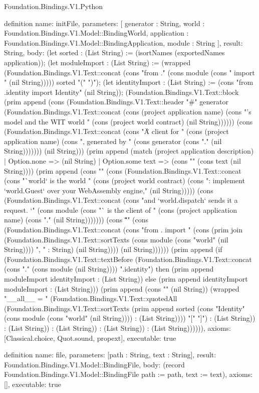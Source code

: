 \begin{lexlean}{Foundation.Bindings.V1.Python}
\begin{semanticmodule}
definition{
  name: initFile,
  parameters: [
    generator : String,
    world : Foundation.Bindings.V1.Model::BindingWorld,
    application : Foundation.Bindings.V1.Model::BindingApplication,
    module : String
  ],
  result: String,
  body: (let sorted : (List String) := (isortNames (exportedNames application)); (let moduleImport : (List String) := (wrapped (Foundation.Bindings.V1.Text::concat (cons "from ." (cons module (cons " import " (nil String))))) sorted "(" ")"); (let identityImport : (List String) := (cons "from .identity import Identity" (nil String)); (Foundation.Bindings.V1.Text::block (prim append (cons (Foundation.Bindings.V1.Text::header "#" generator (Foundation.Bindings.V1.Text::concat (cons (project application name) (cons "'s model and the WIT world " (cons (project world contract) (nil String)))))) (cons (Foundation.Bindings.V1.Text::concat (cons "\"\"\"A client for " (cons (project application name) (cons ", generated by " (cons generator (cons "." (nil String))))))) (nil String))) (prim append (match (project application description)
    | Option.none => (nil String)
    | Option.some text => (cons "" (cons text (nil String)))) (prim append (cons "" (cons (Foundation.Bindings.V1.Text::concat (cons "`world` is the world " (cons (project world contract) (cons ": implement `world.Guest` over your WebAssembly engine," (nil String))))) (cons (Foundation.Bindings.V1.Text::concat (cons "and `world.dispatch` sends it a request. `" (cons module (cons "` is the client of " (cons (project application name) (cons "." (nil String))))))) (cons "\"\"\"\n" (cons (Foundation.Bindings.V1.Text::concat (cons "from . import " (cons (prim join (Foundation.Bindings.V1.Text::sortTexts (cons module (cons "world" (nil String)))) ", " : String) (nil String)))) (nil String)))))) (prim append (if (Foundation.Bindings.V1.Text::textBefore (Foundation.Bindings.V1.Text::concat (cons "." (cons module (nil String)))) ".identity") then (prim append moduleImport identityImport : (List String)) else (prim append identityImport moduleImport : (List String))) (prim append (cons "" (nil String)) (wrapped "__all__ = " (Foundation.Bindings.V1.Text::quotedAll (Foundation.Bindings.V1.Text::sortTexts (prim append sorted (cons "Identity" (cons module (cons "world" (nil String)))) : (List String)))) "[" "]") : (List String)) : (List String)) : (List String)) : (List String)) : (List String)))))),
  axioms: [Classical.choice, Quot.sound, propext],
  executable: true
}

definition{
  name: file,
  parameters: [path : String, text : String],
  result: Foundation.Bindings.V1.Model::BindingFile,
  body: (record Foundation.Bindings.V1.Model::BindingFile {path := path, text := text}),
  axioms: [],
  executable: true
}


\end{semanticmodule}
\end{lexlean}
